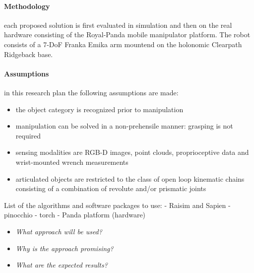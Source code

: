 \paragraph{Methodology} each proposed solution is first evaluated in simulation and then on the real hardware consisting of the Royal-Panda mobile manipulator platform. The robot consists of a 7-DoF Franka Emika arm mountend on the holonomic Clearpath Ridgeback base. 

\paragraph{Assumptions} in this research plan the following assumptions are made:
\begin{itemize}
\item the object category is recognized prior to manipulation
\item manipulation can be solved in a non-prehensile manner: grasping is not required
\item sensing modalities are RGB-D images, point clouds, proprioceptive data and wrist-mounted wrench measurements 
\item articulated objects are restricted to the class of open loop kinematic chains consisting of a combination of revolute and/or prismatic joints
\end{itemize} 

List of the algorithms and software packages to use:
- Raisim and Sapien
- pinocchio
- torch
- Panda platform (hardware)

\begin{itemize}
	\item \emph{What approach will be used?}
	\item \emph{Why is the approach promising?}
	\item \emph{What are the expected results?}
\end{itemize}

